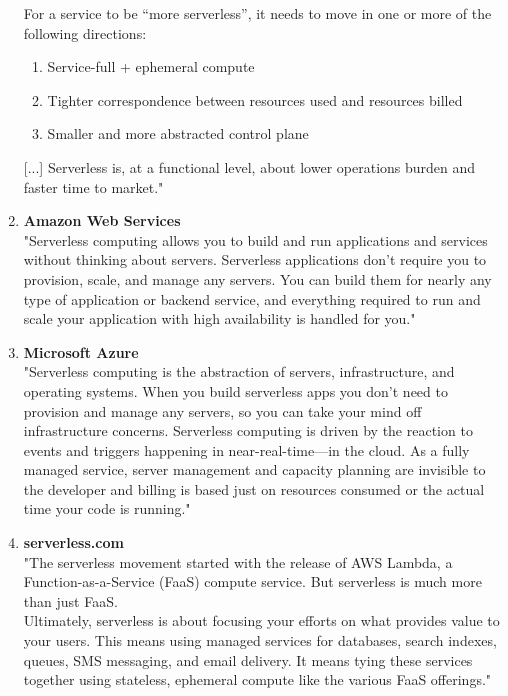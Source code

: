\begin{enumerate}
        For a service to be “more serverless”, it needs to move in one or more of the following directions:
        \begin{enumerate}[nolistsep]
            \item Service-full + ephemeral compute
            \item Tighter correspondence between resources used and resources billed
            \item Smaller and more abstracted control plane
        \end{enumerate}
        [...] Serverless is, at a functional level, about lower operations burden and faster time to market."\autocite{Kehoe2017TheSpectrum}
    \item \textbf{Amazon Web Services}\\
        "Serverless computing allows you to build and run applications and services without thinking about servers. Serverless applications don't require you to provision, scale, and manage any servers. You can build them for nearly any type of application or backend service, and everything required to run and scale your application with high availability is handled for you."\autocite{AmazonWebServices2017ServerlessServices}
    \item \textbf{Microsoft Azure}\\
        "Serverless computing is the abstraction of servers, infrastructure, and operating systems. When you build serverless apps you don’t need to provision and manage any servers, so you can take your mind off infrastructure concerns. Serverless computing is driven by the reaction to events and triggers happening in near-real-time—in the cloud. As a fully managed service, server management and capacity planning are invisible to the developer and billing is based just on resources consumed or the actual time your code is running."\autocite{MicrosoftAzure2017ServerlessAzure}
    \item \textbf{serverless.com}\\
        "The serverless movement started with the release of AWS Lambda, a Function-as-a-Service (FaaS) compute service. But serverless is much more than just FaaS.\\
        Ultimately, serverless is about focusing your efforts on what provides value to your users. This means using managed services for databases, search indexes, queues, SMS messaging, and email delivery. It means tying these services together using stateless, ephemeral compute like the various FaaS offerings."\autocite{ServerlessTeam2017WhyServerless}
\end{enumerate}

